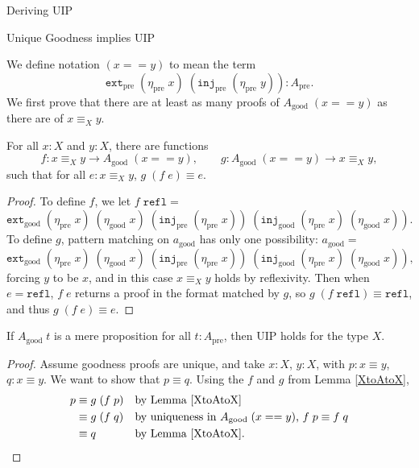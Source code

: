 \documentclass[runningheads]{llncs}
\newcommand{\pre}[1]{{#1}_\text{pre}}
\newcommand{\good}[1]{{#1}_\text{good}}
\newcommand{\Id}[2]{{#1}\equiv{#2}}
\newcommand{\IdA}[3]{{#1}\equiv_{#3}{#2}}
\newcommand{\join}{\texttt{ext}}
\newcommand{\inj}{\texttt{inj}}
\newcommand{\refl}{\texttt{refl}}
\begin{document}
\begin{section}{Deriving UIP}
\begin{subsection}{Unique Goodness implies UIP}

We define notation $(x == y)$ to mean the term \[\pre{\join}\;(\pre{\eta}\;x)\;(\pre{\inj}\;(\pre{\eta}\;y)) : \pre{A}.\]
We first prove that there are at least as many proofs of $\good{A}\;(x == y)$ as there are of $\IdA{x}{y}{X}$.

\begin{lemma}[$\IdA{x}{y}{X}$ is a retract of $\good{A}$]\label{XtoAtoX}
    For all $x : X$ and $y : X$, there are functions \[f : \IdA{x}{y}{X} \to \good{A}\;(x == y),\qquad g : \good{A}\;(x == y) \to \IdA{x}{y}{X},\] such that for all $e : \IdA{x}{y}{X}$, $\Id{g\;(f\;e)}{e}$.
\end{lemma}
\begin{proof}
    To define $f$, we let $f\;\refl =$ \[\good{\join}\;(\pre{\eta}\;x)\;(\good{\eta}\;x)\;(\pre{\inj}\;(\pre{\eta}\;x))\;(\good{\inj}\;(\pre{\eta}\;x)\;(\good{\eta}\;x)).\] To define $g$, pattern matching on $\good{a}$ has only one possibility: $\good{a} = $\[\good{\join}\;(\pre{\eta}\;x)\;(\good{\eta}\;x)\;(\pre{\inj}\;(\pre{\eta}\;x))\;(\good{\inj}\;(\pre{\eta}\;x)\;(\good{\eta}\;x)),\] forcing $y$ to be $x$, and in this case $\IdA{x}{y}{X}$ holds by reflexivity.
    Then when $e = \refl$, $f\;e$ returns a proof in the format matched by $g$, so $\Id{g\;(f\;\refl)}{\refl}$, and thus $\Id{g\;(f\;e)}{e}$.
\end{proof}

\begin{lemma}
    If $\good{A}\;t$ is a mere proposition for all $t : \pre{A}$, then UIP holds for the type $X$.
\end{lemma}
\begin{proof}
    Assume goodness proofs are unique, and take $x : X$, $y : X$, with $p : \Id{x}{y}$, $q : \Id{x}{y}$. We want to show that $\Id{p}{q}$. Using the $f$ and $g$ from Lemma \ref{XtoAtoX}, \begin{align*}
    p &\equiv g\;(f\;p)&&\text{by Lemma \ref{XtoAtoX}}\\
      &\equiv g\;(f\;q)&&\text{by uniqueness in $\good{A}\;(x == y)$, $\Id{f\;p}{f\;q}$}\\
      &\equiv q&&\text{by Lemma \ref{XtoAtoX}}.
    \end{align*}
\end{proof}

\end{subsection}


\end{section}
\end{document}
